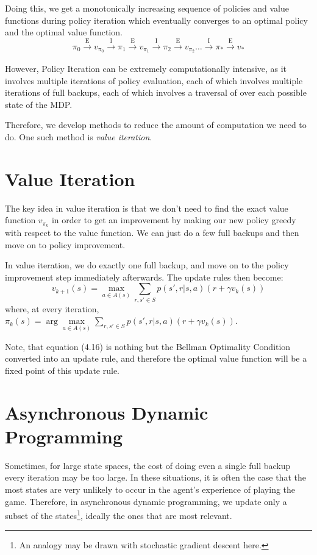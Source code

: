 \documentclass[12pt]{report}
\begin{document}
Doing this, we get a monotonically increasing sequence of policies and value functions during policy iteration which eventually converges to an optimal policy and the optimal value function.
\begin{equation*}
    \pi_{0} \xrightarrow[]{\text{E}} v_{\pi_{0}} \xrightarrow[]{\text{I}} \pi_{1} \xrightarrow[]{\text{E}} v_{\pi_{1}} \xrightarrow[]{\text{I}} \pi_{2} \xrightarrow[]{\text{E}} v_{\pi_{2}} \dots \xrightarrow[]{\text{I}} \pi_{*} \xrightarrow[]{\text{E}} v_{*}
\end{equation*}

However, Policy Iteration can be extremely computationally intensive, as it involves multiple iterations of policy evaluation, each of which involves multiple iterations of full backups, each of which involves a traversal of over each possible state of the MDP. 

Therefore, we develop methods to reduce the amount of computation we need to do. One such method is \textit{value iteration}.

\section{Value Iteration}
The key idea in value iteration is that we don't need to find the exact value function $v_{\pi_{k}}$ in order to get an improvement by making our new policy greedy with respect to the value function. We can just do a few full backups and then move on to policy improvement.

In value iteration, we do exactly one full backup, and move on to the policy improvement step immediately afterwards. The update rules then become:
\begin{equation}
    v_{k + 1}(s) = \max\limits_{a \in A(s)} \sum\limits_{r, s' \in S} p(s', r | s, a) (r + \gamma v_{k}(s))
\end{equation}
where, at every iteration, $\pi_{k}(s) = \arg\max\limits_{a \in A(s)} \sum\limits_{r, s' \in S} p(s', r | s, a) (r + \gamma v_{k}(s))$.

Note, that equation (4.16) is nothing but the Bellman Optimality Condition converted into an update rule, and therefore the optimal value function will be a fixed point of this update rule.
\section{Asynchronous Dynamic Programming}
Sometimes, for large state spaces, the cost of doing even a single full backup every iteration may be too large. In these situations, it is often the case that the most states are very unlikely to occur in the agent's experience of playing the game. 
Therefore, in asynchronous dynamic programming, we update only a subset of the states\footnote{An analogy may be drawn with stochastic gradient descent here.}, ideally the ones that are most relevant. 
\end{document}
